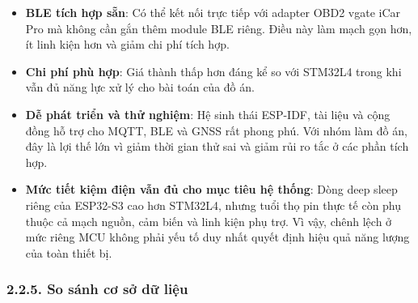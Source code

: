 \documentclass[a4paper]{extarticle}
\providecommand{\tightlist}{%
  \setlength{\itemsep}{0pt}\setlength{\parskip}{0pt}}
\begin{document}
\begin{itemize}
\tightlist
\item
  \textbf{BLE tích hợp sẵn}: Có thể kết nối trực tiếp với adapter OBD2
  vgate iCar Pro mà không cần gắn thêm module BLE riêng. Điều này làm
  mạch gọn hơn, ít linh kiện hơn và giảm chi phí tích hợp.
\item
  \textbf{Chi phí phù hợp}: Giá thành thấp hơn đáng kể so với STM32L4
  trong khi vẫn đủ năng lực xử lý cho bài toán của đồ án.
\item
  \textbf{Dễ phát triển và thử nghiệm}: Hệ sinh thái ESP-IDF, tài liệu
  và cộng đồng hỗ trợ cho MQTT, BLE và GNSS rất phong phú. Với nhóm làm
  đồ án, đây là lợi thế lớn vì giảm thời gian thử sai và giảm rủi ro tắc
  ở các phần tích hợp.
\item
  \textbf{Mức tiết kiệm điện vẫn đủ cho mục tiêu hệ thống}: Dòng deep
  sleep riêng của ESP32-S3 cao hơn STM32L4, nhưng tuổi thọ pin thực tế
  còn phụ thuộc cả mạch nguồn, cảm biến và linh kiện phụ trợ. Vì vậy,
  chênh lệch ở mức riêng MCU không phải yếu tố duy nhất quyết định hiệu
  quả năng lượng của toàn thiết bị.
\end{itemize}

\subsubsection{2.2.5. So sánh cơ sở dữ
liệu}\label{225-so-suxe1nh-cux1a1-sux1edf-dux1eef-liux1ec7u}
\end{document}
